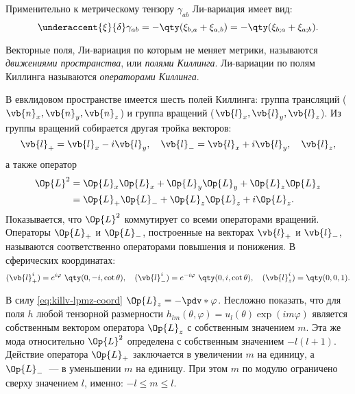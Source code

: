 \documentclass[\docroot/reports/draft/report.tex]{subfiles}
\begin{document}
    Применительно к метрическому тензору $\gamma_{ab}$ Ли-вариация имеет вид:
    \begin{equation}\label{eq:lie-tm}
        \underaccent{\xi}{\delta} \gamma_{ab}
            = - \qty(\xi_{b,a} + \xi_{a,b})
            = - \qty(\xi_{b;a} + \xi_{a;b}).
    \end{equation}

    Векторные поля, Ли-вариация по которым не меняет метрики, называются \textit{движениями пространства}, или \textit{полями Киллинга}. Ли-вариации по полям Киллинга называются \textit{операторами Киллинга}.

    В евклидовом пространстве имеется шесть полей Киллинга: группа трансляций ($\vb{n}_x,\vb{n}_y,\vb{n}_z$) и группа вращений ($\vb{l}_x,\vb{l}_y,\vb{l}_z$). Из группы вращений собирается другая тройка векторов:
    \begin{equation}\label{eq:killv-lpmz}
        \vb{l}_{+} = \vb{l}_x - i \vb{l}_y, \quad
        \vb{l}_{-} = \vb{l}_x + i \vb{l}_y, \quad
        \vb{l}_z,
    \end{equation}
    а также оператор
    \begin{equation}\begin{aligned}\label{eq:killv-l2}
        \Op{L}^2 &= \Op{L}_x\Op{L}_x + \Op{L}_y\Op{L}_y + \Op{L}_z\Op{L}_z \\
                 &= \Op{L}_{+}\Op{L}_{-} + \Op{L}_z\Op{L}_z + i \Op{L}_z.
    \end{aligned}\end{equation}
    Показывается, что $\Op{L}^2$ коммутирует со всеми операторами вращений. Операторы $\Op{L}_{+}$ и $\Op{L}_{-}$, построенные на векторах $\vb{l}_{+}$ и $\vb{l}_{-}$, называются соответственно операторами повышения и понижения.
    В сферических координатах:
    \begin{equation}\label{eq:killv-lpmz-coord}
        (\vb{l}_{+}^i) = e^{i\varphi}\ \qty(0,-i,\cot\theta), \quad
        (\vb{l}_{-}^i) = e^{-i\varphi}\ \qty(0,i,\cot\theta), \quad
        (\vb{l}_z^i)   = \qty(0,0,1).
    \end{equation}

    В силу \autoref{eq:killv-lpmz-coord} $\Op{L}_z = -\pdv*{\varphi}$. Несложно показать, что для поля $h$ любой тензорной размерности $h_{lm}(\theta,\varphi) = u_l(\theta) \exp(im\varphi)$ является собственным вектором оператора $\Op{L}_z$ с собственным значением $m$. Эта же мода относительно $\Op{L}^2$ определена с собственным значением $-l(l+1)$. Действие оператора $\Op{L}_{+}$ заключается в увеличении $m$ на единицу, а $\Op{L}_{-}$~--- в уменьшении $m$ на единицу. При этом $m$ по модулю ограничено сверху значением $l$, именно: $-l \le m \le l$.
\end{document}

